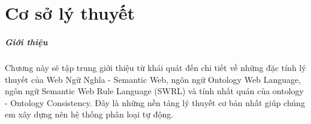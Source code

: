 \chapter{Cơ sở lý thuyết}
\paragraph{Giới thiệu} Chương này sẽ tập trung giới thiệu từ khái quát đến chi tiết về những đặc tính lý thuyết của Web Ngữ Nghĩa - Semantic Web, ngôn ngữ Ontology Web Language, ngôn ngữ Semantic Web Rule Language (SWRL) và tính nhất quán của ontology - Ontology Consistency. Đây là những nền tảng lý thuyết cơ bản nhất giúp chúng em xây dựng nên hệ thống phân loại tự động.

